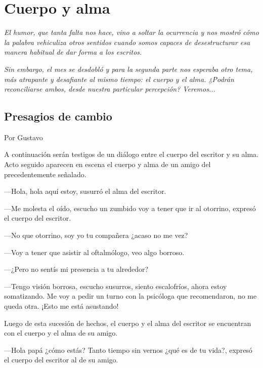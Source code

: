 \documentclass[11pt,twoside,openright,a5paper]{book}
\begin{document}
\chapter*{Cuerpo y alma}

\emph{El humor, que tanta falta nos hace, vino a soltar la ocurrencia y nos mostró cómo la palabra vehiculiza  otros sentidos cuando somos capaces de desestructurar esa manera habitual de dar forma a los escritos.}

\emph{Sin embargo, el mes se desdobló y para la segunda parte nos esperaba otro tema, más atrapante y desafiante al mismo tiempo: el cuerpo y el alma. ¿Podrán reconciliarse ambos, desde nuestra particular percepción? Veremos...}

\section*{Presagios de cambio }

                                                                                        \begin{flushright}Por Gustavo\end{flushright}
                                                                                     
A continuación serán testigos de un diálogo entre el cuerpo del escritor y su alma. Acto seguido aparecen en escena el cuerpo y alma de un amigo del precedentemente señalado.

---Hola, hola aquí estoy, susurró el alma del escritor.

---Me molesta el oído, escucho un zumbido voy a tener que ir al otorrino, expresó el cuerpo del escritor.

---No que otorrino, soy yo tu compañera ¿acaso no me vez?

---Voy a tener que asistir al oftalmólogo, veo algo borroso.

---¿Pero no sentís mi presencia a tu alrededor?

---Tengo visión borrosa, escucho susurros, siento escalofríos, ahora estoy somatizando. Me voy a pedir un turno con la psicóloga que recomendaron, no me queda otra. ¡Esto me está asustando!

Luego de esta sucesión de hechos, el cuerpo y el alma del escritor se encuentran con el cuerpo y el alma de su amigo.

---Hola papá ¿cómo estás? Tanto tiempo sin vernos ¿qué es de tu vida?, expresó el cuerpo del escritor al de su amigo.
\end{document}
